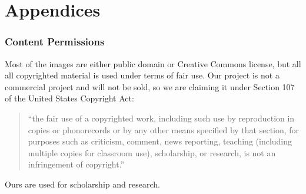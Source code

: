 \documentclass[a4paper,10pt]{article}
\begin{document}
\pagebreak


\section{Appendices}

\subsubsection{Content Permissions}
Most of the images are either public domain or Creative Commons license, but all all copyrighted material is used under terms of fair use.  Our project is not a commercial project and will not be sold, so we are claiming it under Section 107 of the United States Copyright Act:
\begin{quotation}
	``the fair use of a copyrighted work, including such use by reproduction in copies or phonorecords or by any other means specified by that section, for purposes such as criticism, comment, news reporting, teaching (including multiple copies for classroom use), scholarship, or research, is not an infringement of copyright.''
\end{quotation}

Ours are used for scholarship and research.

\end{document}
